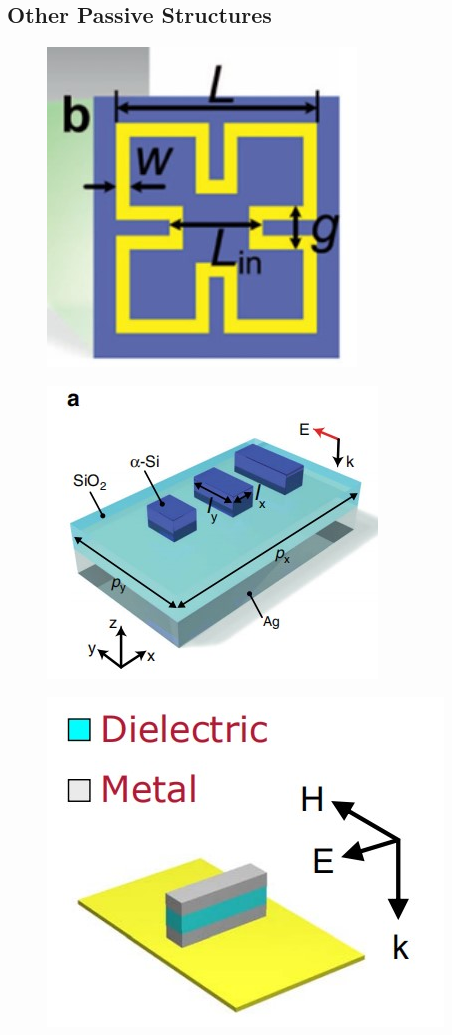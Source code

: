 \documentclass[]{article}
\begin{document}
	\subsection*{Other Passive Structures}
		\begin{figure}[H]
		\centering
		\includegraphics[scale=0.8]{Fig/10.jpg}
	\end{figure}
	
	\begin{figure}[H]
		\centering
		\includegraphics[scale=0.8]{Fig/11.jpg}
	\end{figure}
	
	\begin{figure}[H]
		\centering
		\includegraphics[scale=0.8]{Fig/12.jpg}
	\end{figure}
\end{document}
